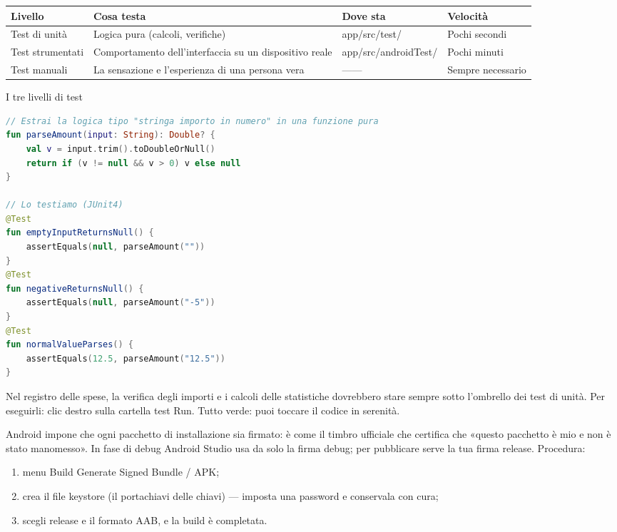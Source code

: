 \begin{center}
\begin{tabularx}{\linewidth}{|X|X|X|X|}
\hline
\textbf{Livello} & \textbf{Cosa testa} & \textbf{Dove sta} & \textbf{Velocità} \tabularnewline
\hline
Test di unità & Logica pura (calcoli, verifiche) & app/src/test/ & Pochi secondi \tabularnewline
Test strumentati & Comportamento dell'interfaccia su un dispositivo reale & app/src/androidTest/ & Pochi minuti \tabularnewline
Test manuali & La sensazione e l'esperienza di una persona vera & —— & Sempre necessario \tabularnewline
\hline
\end{tabularx}
\end{center}

\begin{center}\small\color{gray}I tre livelli di test\end{center}

\begin{lstlisting}[language=Kotlin]
// Estrai la logica tipo "stringa importo in numero" in una funzione pura
fun parseAmount(input: String): Double? {
    val v = input.trim().toDoubleOrNull()
    return if (v != null && v > 0) v else null
}

// Lo testiamo (JUnit4)
@Test
fun emptyInputReturnsNull() {
    assertEquals(null, parseAmount(""))
}
@Test
fun negativeReturnsNull() {
    assertEquals(null, parseAmount("-5"))
}
@Test
fun normalValueParses() {
    assertEquals(12.5, parseAmount("12.5"))
}
\end{lstlisting}

Nel registro delle spese, la verifica degli importi e i calcoli delle statistiche dovrebbero stare sempre sotto l'ombrello dei test di unità. Per eseguirli: clic destro sulla cartella test Run. Tutto verde: puoi toccare il codice in serenità.


Android impone che ogni pacchetto di installazione sia firmato: è come il timbro ufficiale che certifica che «questo pacchetto è mio e non è stato manomesso». In fase di debug Android Studio usa da solo la firma debug; per pubblicare serve la tua firma release. Procedura:

\begin{enumerate}
  \item menu Build Generate Signed Bundle / APK;
  \item crea il file keystore (il portachiavi delle chiavi) — imposta una password e conservala con cura;
  \item scegli release e il formato AAB, e la build è completata.
\end{enumerate}

